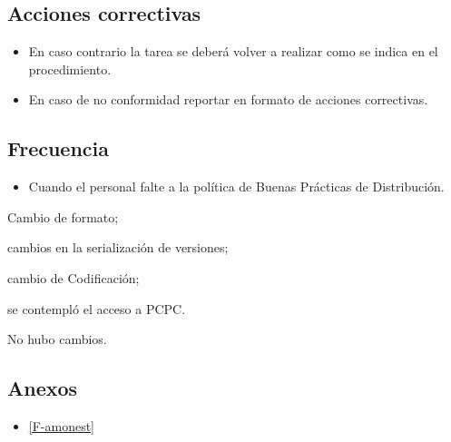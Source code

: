 \subsection{Acciones correctivas}

\begin{itemize}
	\item En caso contrario la tarea se deberá volver a realizar como se indica en el procedimiento.
	\item En caso de no conformidad reportar en formato de acciones correctivas.
\end{itemize}

\subsection{Frecuencia}
\begin{itemize}
	\item Cuando el personal falte a la política de Buenas Prácticas de Distribución.
\end{itemize}

\begin{changelog}[simple, sectioncmd=\subsection*,label=changelog-1.6]
	\begin{version}[v=2.1, date=2023--01, author=Pablo E. Alanis]
			\item Cambio de formato;
			\item cambios en la serialización de versiones;
			\item cambio de Codificación;
			\item se contempló el acceso a PCPC.
	\end{version}

	\begin{version}[v=1.6, date=2022--05, author=Alonso M.]
		\item No hubo cambios.
	\end{version}

\end{changelog}

\subsection*{Anexos}

\begin{itemize}
	\item \cref{F-amonest}
\end{itemize}